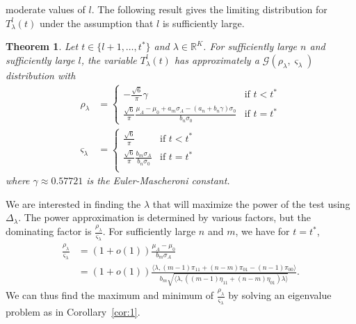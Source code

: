 \documentclass[10pt,draftclsnofoot,onecolumn]{IEEEtran}
\newtheorem{theorem}{Theorem}
\theoremstyle{definition}
\begin{document}
moderate values of $l$. The following result gives the limiting
distribution for $T_{\lambda}^{l}(t)$ under the assumption that $l$ is
sufficiently large. 
\begin{theorem}
  \label{thm:8}
  Let $t \in \{l+1, \dots, t^{*}\}$ and $\lambda \in
  \mathbb{R}^{K}$. For sufficiently large $n$ and sufficiently large
  $l$, the variable $T_{\lambda}^{l}(t)$ has approximately a
  $\mathcal{G}(\rho_{\lambda}, \varsigma_{\lambda})$ distribution with
\begin{align}
  \label{eq:13}
  \rho_{\lambda} &= \begin{cases}
      - \frac{ \sqrt{6}}{\pi} \gamma & \text{if $t < t^{*}$} \\
    \frac{\sqrt{6}}{\pi} \frac{\mu_A - \mu_0 + a_m\sigma_A - (a_n + b_n
      \gamma)\sigma_0}{b_n \sigma_0} & \text{if $t =
        t^{*}$} 
  \end{cases}\\
  \varsigma_{\lambda} &= \begin{cases}
    \frac{\sqrt{6}}{\pi} & \text{if $t < t^{*}$} \\
    \frac{\sqrt{6}}{\pi}\frac{b_m \sigma_A}{ b_n \sigma_0} & \text{if $t =
      t^{*}$} \\
    \end{cases}
\end{align}
where $\gamma \approx 0.57721$ is the Euler-Mascheroni constant.
\end{theorem}
We are interested in finding the $\lambda$ that will maximize the
power of the test using $\Delta_{\lambda}$. The power approximation is
determined by various factors, but the dominating factor is
$\tfrac{\rho_\lambda}{\varsigma_\lambda}$. For sufficiently large $n$
and $m$, we have for $t = t^{*}$,
\begin{equation*}
  \begin{split}
  \frac{\rho_\lambda}{\varsigma_\lambda} &= (1 + o(1)) \frac{\mu_A - \mu_0}{b_m
    \sigma_A} \\ &= (1 + o(1)) \frac{\langle \lambda, (m-1)\pi_{11} + (n-m)\pi_{01} -
    (n-1) \pi_{00} \rangle}{b_m \sqrt{\langle \lambda, ((m-1) \eta_{11} +
    (n-m)\eta_{01}) \lambda \rangle}}.
  \end{split}
\end{equation*}
We can thus find the maximum and minimum of
$\tfrac{\rho_{\lambda}}{\varsigma_{\lambda}}$ by solving an 
eigenvalue problem as in Corollary~\ref{cor:1}.
\end{document}
